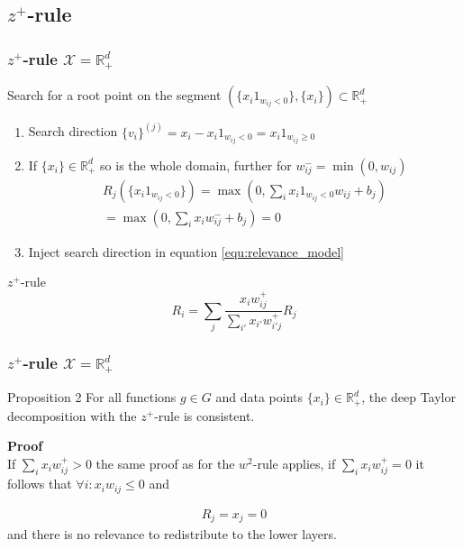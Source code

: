 \documentclass{beamer}
\begin{document}
\subsection[$z^+$-rule]{$z^+$-rule}


\begin{frame}
\frametitle{$z^+$-rule $\mathcal{X}=\mathbb{R}_+^d$}
\vspace{0.25cm}
Search for a root point on the segment $(\{x_i 1_{w_{ij}<0}\},\{x_i\})\subset \mathbb{R}_+^d$\\
\begin{enumerate}
	\item Search direction $\{v_i\}^{(j)} = x_i - x_i 1_{w_{ij}<0} = x_i 1_{w_{ij}\geq0}$
	\item If $\{x_i\} \in \mathbb{R}_+^d$ so is the whole domain, further for $w_{ij}^-=\min(0,w_{ij})$
	\
	\begin{align*}
		R_j(\{x_i1_{w_{ij}<0}\}) = \max(0, \sum_i x_i 1_{w_{ij}<0} w_{ij} + b_j)\\
		= \max(0, \sum_i x_i  w_{ij}^- + b_j) = 0
	\end{align*}
	
	\item Inject search direction in equation \eqref{equ:relevance_model}
\end{enumerate}


\begin{block}{$z^+$-rule}
\begin{equation*}
R_i =  \sum_j \frac{x_i w_{ij}^+}{\sum_{i'} x_{i'} w_{i'j}^+} R_j
\end{equation*}
\end{block}

\end{frame}



\begin{frame}
\frametitle{$z^+$-rule $\mathcal{X}=\mathbb{R}^d_+$}
\vspace{-0.4cm}
\begin{block}{Proposition 2}
For all functions $g \in G$ and data points $\{x_i\} \in \mathbb{R}_+^d$, the deep Taylor decomposition with the $z^+$-rule is consistent.
\end{block}
\vspace{0.5cm}
\textbf{Proof}\\
If $\sum_i x_i w_{ij}^+ >0$ the same proof as for the $w^2$-rule applies, if $\sum_i x_i w_{ij}^+ =0$ it follows that $\forall i: x_i w_{ij} \leq0$ and 

\begin{align*}
 R_j = x_j = 0
\end{align*}
and there is no relevance to redistribute to the lower layers.


\end{frame}
\end{document}

